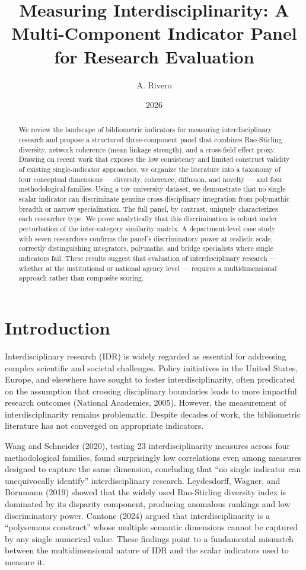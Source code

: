 \documentclass[
]{article}
\title{Measuring Interdisciplinarity: A Multi-Component Indicator Panel
for Research Evaluation}
\author{A. Rivero}
\date{2026}
\begin{document}
\maketitle
\begin{abstract}
We review the landscape of bibliometric indicators for measuring
interdisciplinary research and propose a structured three-component
panel that combines Rao-Stirling diversity, network coherence (mean
linkage strength), and a cross-field effect proxy. Drawing on recent
work that exposes the low consistency and limited construct validity of
existing single-indicator approaches, we organize the literature into a
taxonomy of four conceptual dimensions --- diversity, coherence,
diffusion, and novelty --- and four methodological families. Using a toy
university dataset, we demonstrate that no single scalar indicator can
discriminate genuine cross-disciplinary integration from polymathic
breadth or narrow specialization. The full panel, by contrast, uniquely
characterizes each researcher type. We prove analytically that this
discrimination is robust under perturbation of the inter-category
similarity matrix. A department-level case study with seven researchers
confirms the panel's discriminatory power at realistic scale, correctly
distinguishing integrators, polymaths, and bridge specialists where
single indicators fail. These results suggest that evaluation of
interdisciplinary research --- whether at the institutional or national
agency level --- requires a multidimensional approach rather than
composite scoring.
\end{abstract}

\hypertarget{introduction}{%
\section{Introduction}\label{introduction}}

Interdisciplinary research (IDR) is widely regarded as essential for
addressing complex scientific and societal challenges. Policy
initiatives in the United States, Europe, and elsewhere have sought to
foster interdisciplinarity, often predicated on the assumption that
crossing disciplinary boundaries leads to more impactful research
outcomes (National Academies, 2005). However, the measurement of
interdisciplinarity remains problematic. Despite decades of work, the
bibliometric literature has not converged on appropriate indicators.

Wang and Schneider (2020), testing 23 interdisciplinarity measures
across four methodological families, found surprisingly low correlations
even among measures designed to capture the same dimension, concluding
that ``no single indicator can unequivocally identify''
interdisciplinary research. Leydesdorff, Wagner, and Bornmann (2019)
showed that the widely used Rao-Stirling diversity index is dominated by
its disparity component, producing anomalous rankings and low
discriminatory power. Cantone (2024) argued that interdisciplinarity is
a ``polysemous construct'' whose multiple semantic dimensions cannot be
captured by any single numerical value. These findings point to a
fundamental mismatch between the multidimensional nature of IDR and the
scalar indicators used to measure it.
\end{document}
